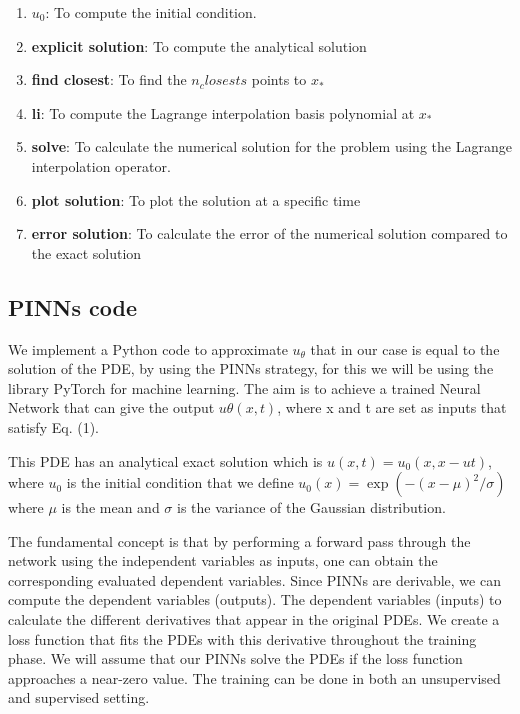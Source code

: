 \documentclass{article}
\begin{document}
\begin{enumerate}
   \item \textbf{$u_0$}: To compute the initial condition.
   \item \textbf{explicit solution}: To compute the analytical solution
   \item \textbf{find closest}: To find the $n_closests$ points to $x_{*}$
   \item \textbf{li}: To compute the Lagrange interpolation basis polynomial at $x_{*}$
   \item \textbf{solve}: To calculate the numerical solution for the problem using the Lagrange interpolation operator.
   \item \textbf{plot solution}: To plot the solution at a specific time
   \item \textbf{error solution}: To calculate the error of the numerical solution compared to the exact solution
\end{enumerate}


\subsection{PINNs code}

We implement a Python code to approximate  $u_\theta$ that in our case is equal to the solution of the PDE, by using the PINNs strategy, for this we will be using the library PyTorch for machine learning.
The aim is to achieve a trained Neural Network that can give the output $u\theta(x, t)$, where x and t are set as inputs that satisfy Eq. (1). 

This PDE has an analytical exact solution which is $u(x,t) = u_0(x,x-ut)$, where $u_0$ is the initial condition that we define $u_0(x) = \exp(-(x-\mu)^2/\sigma)$ where $\mu$ is the mean and $\sigma$ is the variance of the Gaussian distribution. 

The fundamental concept is that by performing a forward pass through the network using the independent variables as inputs, one can obtain the corresponding evaluated dependent variables.
Since PINNs are derivable, we can compute the dependent variables (outputs). The dependent variables (inputs) to calculate the different derivatives that appear in the original PDEs. We create a loss function that fits the PDEs with this derivative throughout the training phase. 
We will assume that our PINNs solve the PDEs if the loss function approaches a near-zero value. The training can be done in both an unsupervised and supervised setting.\\
\end{document}
